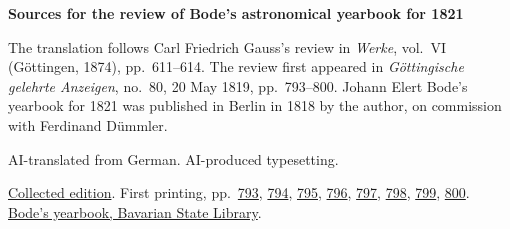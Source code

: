 \clearpage\thispagestyle{empty}
\begin{center}\Large\bfseries Sources for the review of Bode’s astronomical yearbook for 1821\end{center}

The translation follows Carl Friedrich Gauss’s review in \emph{Werke}, vol.~VI (Göttingen, 1874), pp.~611--614. The review first appeared in \emph{Göttingische gelehrte Anzeigen}, no.~80, 20 May 1819, pp.~793--800. Johann Elert Bode’s yearbook for 1821 was published in Berlin in 1818 by the author, on commission with Ferdinand Dümmler.

AI-translated from German. AI-produced typesetting.

\href{https://gdz.sub.uni-goettingen.de/id/PPN236007467}{Collected edition}. First printing, pp.~\href{https://images.p.sub.uni-goettingen.de/iiif/image/gdz:PPN319721507_1819:00000797/full/1650,/0/default.jpg}{793}, \href{https://images.p.sub.uni-goettingen.de/iiif/image/gdz:PPN319721507_1819:00000798/full/1650,/0/default.jpg}{794}, \href{https://images.p.sub.uni-goettingen.de/iiif/image/gdz:PPN319721507_1819:00000799/full/1650,/0/default.jpg}{795}, \href{https://images.p.sub.uni-goettingen.de/iiif/image/gdz:PPN319721507_1819:00000800/full/1650,/0/default.jpg}{796}, \href{https://images.p.sub.uni-goettingen.de/iiif/image/gdz:PPN319721507_1819:00000801/full/1650,/0/default.jpg}{797}, \href{https://images.p.sub.uni-goettingen.de/iiif/image/gdz:PPN319721507_1819:00000802/full/1650,/0/default.jpg}{798}, \href{https://images.p.sub.uni-goettingen.de/iiif/image/gdz:PPN319721507_1819:00000803/full/1650,/0/default.jpg}{799}, \href{https://images.p.sub.uni-goettingen.de/iiif/image/gdz:PPN319721507_1819:00000804/full/1650,/0/default.jpg}{800}. \href{https://www.digitale-sammlungen.de/view/bsb10538350?page=3}{Bode’s yearbook, Bavarian State Library}.

\clearpage
